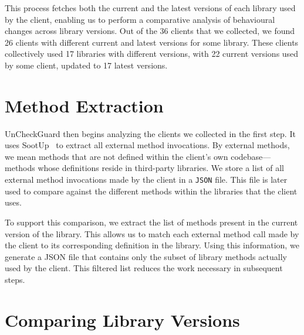 This process fetches both the current and the latest versions of each library used by the client, enabling us to perform a comparative analysis of behavioural changes across library versions. Out of the 36 clients that we collected, we found 26 clients with different current and latest versions for some library. These clients collectively used 17 libraries with different versions, with 22 current versions used by some client, updated to 17 latest versions.

\section{Method Extraction}


UnCheckGuard then begins analyzing the clients we collected in the first step. It uses SootUp~\cite{Karakaya24:_SootUp} to extract all external method invocations. By external methods, we mean methods that are not defined within the client's own codebase—methods whose definitions reside in third-party libraries. We store a list of all external method invocations made by the client in a \texttt{JSON} file. This file is later used to compare against the different methods within the libraries that the client uses.

To support this comparison, we extract the list of methods present in the current version of the library. This allows us to match each external method call made by the client to its corresponding definition in the library. Using this information, we generate a JSON file that contains only the subset of library methods actually used by the client. This filtered list reduces the work necessary in subsequent steps.


\section{Comparing Library Versions}

